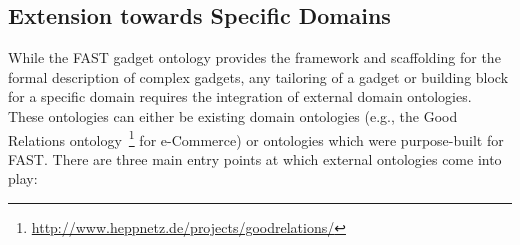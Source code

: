 \documentclass{article}
\begin{document}
\singlespacing
{}
\begin{figure}
	
\end{figure}
\doublespacing



\subsection{Extension towards Specific Domains} %
\label{sub:extension_towards_specific_domains}

While the FAST gadget ontology provides the framework and scaffolding for the formal description of complex gadgets, any  tailoring of a gadget or building block for a specific domain requires the integration of external domain ontologies. These ontologies can either be existing domain ontologies (e.g., the Good Relations ontology~\cite{Hepp:2008jr}\footnote{\url{http://www.heppnetz.de/projects/goodrelations/}} for e-Commerce) or ontologies which were purpose-built for FAST.
There are three main entry points at which external ontologies come into play:
\end{document}
